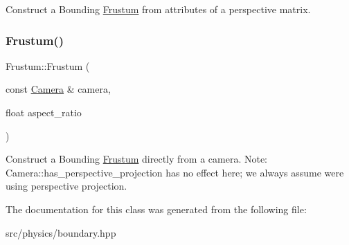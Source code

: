 Construct a Bounding \mbox{\hyperlink{class_frustum}{Frustum}} from attributes of a perspective matrix. \mbox{\label{class_frustum_a5ac3dd6a67b1a705570bbb113aa8b923}} 
\subsubsection{\texorpdfstring{Frustum()}{Frustum()}\hspace{0.1cm}{\footnotesize\ttfamily [2/2]}}
{\footnotesize\ttfamily Frustum\+::\+Frustum (\begin{DoxyParamCaption}\item[{const \mbox{\hyperlink{class_camera}{Camera}} \&}]{camera,  }\item[{float}]{aspect\+\_\+ratio }\end{DoxyParamCaption})}

Construct a Bounding \mbox{\hyperlink{class_frustum}{Frustum}} directly from a camera. Note\+: Camera\+::has\+\_\+perspective\+\_\+projection has no effect here; we always assume we\textquotesingle{}re using perspective projection. 

The documentation for this class was generated from the following file\+:\begin{DoxyCompactItemize}
\item 
src/physics/boundary.\+hpp\end{DoxyCompactItemize}
